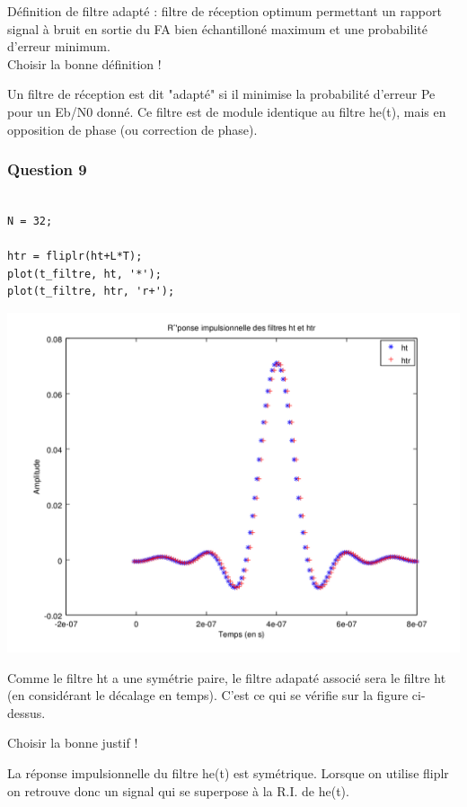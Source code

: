 \documentclass{acm_proc_article-sp}
\begin{document}
\begin{center}
\begin{center}
Définition de filtre adapté : filtre de réception optimum permettant un rapport signal à bruit en sortie du FA bien échantilloné maximum et une probabilité d'erreur minimum.\\

Choisir la bonne définition !

Un filtre de réception est dit "adapté" si il minimise la probabilité d'erreur Pe pour un Eb/N0 donné.
Ce filtre est de module identique au filtre he(t), mais en opposition de phase (ou correction de phase).


\subsubsection{Question 9}

\begin{center}
\begin{lstlisting}

N = 32;

htr = fliplr(ht+L*T);
plot(t_filtre, ht, '*');
plot(t_filtre, htr, 'r+');
\end{lstlisting}

\includegraphics[scale=0.45]{ht_htr_9.png}
\end{center}


Comme le filtre ht a une symétrie paire, le filtre adapaté associé sera le filtre ht (en considérant le décalage en temps). C'est ce qui se vérifie sur la figure ci-dessus.

Choisir la bonne justif !

La réponse impulsionnelle du filtre he(t) est symétrique. Lorsque on utilise fliplr on retrouve donc un signal qui se superpose à la R.I. de he(t).


\end{center}
\end{center}
\end{document}
